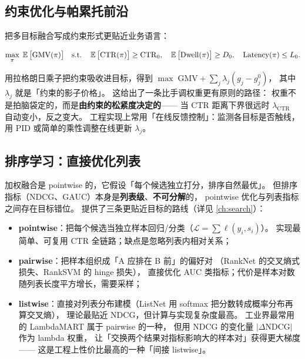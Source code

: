 \subsection{约束优化与帕累托前沿}

把多目标融合写成约束形式更贴近业务语言：

\begin{equation}
\max_{\pi} \; \operatorname{\mathbb{E}}\big[ \mathrm{GMV}(\pi) \big]
\quad \text{s.t.} \quad
\operatorname{\mathbb{E}}\big[ \mathrm{CTR}(\pi) \big] \ge \mathrm{CTR}_0, \quad
\operatorname{\mathbb{E}}\big[ \mathrm{Dwell}(\pi) \big] \ge D_0, \quad
\mathrm{Latency}(\pi) \le L_0 .
\label{eq:fusion-constrained}
\end{equation}

用拉格朗日乘子把约束吸收进目标，得到
$\max \; \mathrm{GMV} + \sum_j \lambda_j (g_j - g_j^0)$，
其中 $\lambda_j$ 就是「约束的影子价格」。
这给出了一条比手调权重更有原则的路径：
权重不是拍脑袋定的，而是\textbf{由约束的松紧度决定的}——
当 CTR 距离下界很远时 $\lambda_{\mathrm{CTR}}$ 自动变小，反之变大。
工程实现上常用「在线反馈控制」：监测各目标是否触线，用 PID 或简单的乘性调整在线更新 $\lambda_j$。

\subsection{排序学习：直接优化列表}

加权融合是 pointwise 的，它假设「每个候选独立打分，排序自然最优」。
但排序指标（NDCG、GAUC）本身是\textbf{列表级}、\textbf{不可分解}的，
pointwise 优化与列表指标之间存在目标错位。
提供了三条更贴近目标的路线（详见 \cref{ch:search}）：

\begin{itemize}
  \item \textbf{pointwise}：把每个候选当独立样本回归/分类（$\mathcal{L} = \sum \ell(y_i, s_i)$）。
        实现最简单、可复用 CTR 全链路；缺点是忽略列表内相对关系；
  \item \textbf{pairwise}：把样本组织成「A 应排在 B 前」的偏好对
        （RankNet \cite{burges2005ranknet} 的交叉熵式损失、RankSVM \cite{joachims2006svmrank} 的 hinge 损失），
        直接优化 AUC 类指标；代价是样本对数随列表长度平方增长，需要采样；
  \item \textbf{listwise}：直接对列表分布建模（ListNet \cite{cao2007listnet} 用 softmax 把分数转成概率分布再算交叉熵），
        理论最贴近 NDCG，但计算与实现复杂度最高。
        工业界最常用的 LambdaMART \cite{wu2010lambdamart} 属于 pairwise 的一种，
        但用 NDCG 的变化量 $|\Delta \mathrm{NDCG}|$ 作为 lambda 权重，
        让「交换两个结果对指标影响大的样本对」获得更大梯度——
        这是工程上性价比最高的一种「间接 listwise」。
\end{itemize}

